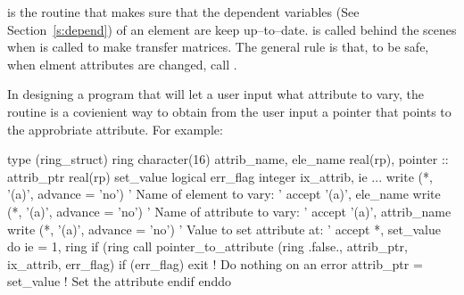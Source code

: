 {{{{{{{{{{{{ is the routine that makes sure that the
dependent variables (See Section~\ref{s:depend}) of an element are
keep up--to--date.  is called behind the
scenes when  is called to make transfer matrices. The
general rule is that, to be safe, when elment attributes are changed,
call .

In designing a program that will let a user input what
attribute to vary, the routine  
is a covienient way to obtain from the user input a pointer
that points to the approbriate attribute.
For example:
\begin{example}
  type (ring_struct) ring
  character(16) attrib_name, ele_name
  real(rp), pointer :: attrib_ptr
  real(rp) set_value
  logical err_flag
  integer ix_attrib, ie
  ...
  write (*, '(a)', advance = 'no') ' Name of element to vary: '
  accept '(a)', ele_name
  write (*, '(a)', advance = 'no') ' Name of attribute to vary: '
  accept '(a)', attrib_name
  write (*, '(a)', advance = 'no') ' Value to set attribute at: '
  accept *, set_value
  do ie = 1, ring%
    if (ring%
      call pointer_to_attribute (ring%
                            .false., attrib_ptr, ix_attrib, err_flag)
      if (err_flag) exit      ! Do nothing on an error
      attrib_ptr = set_value  ! Set the attribute
    endif
  enddo
\end{example}

\vn{%
whether it is the strength or field that is the 
independent variable. See Section~\ref{s:depend} for more details.

\section{Transfer Maps}
\index{Ele_struct!transfer maps}
\index{Transfer map!in ele_struct}

The first order transfer map through a element is stored in \vn{vec0}
and \vn{mat6}. Thus with \vn{Linear} tracking the appropriate formula is
\begin{example}
  orbit_out = %
\end{example}
The \bmad routines that compute \vn{%
take a reference orbit as an argument and the resulting \vn{%
is the Jacobian about the reference orbit.

}}}}}}}}}}}}}}}
